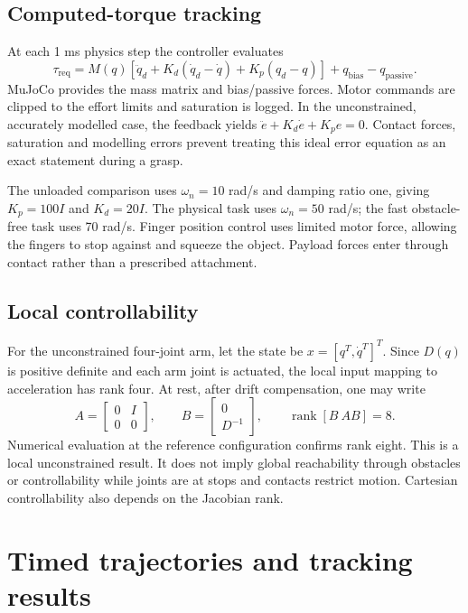 \documentclass[11pt,a4paper]{article}
\begin{document}
\subsection{Computed-torque tracking}
At each 1 ms physics step the controller evaluates
\begin{equation}
 \tau_{\mathrm{req}}=M(q)\left[\ddot q_d+K_d(\dot q_d-\dot q)+K_p(q_d-q)\right]
 +q_{\mathrm{bias}}-q_{\mathrm{passive}}.
\end{equation}
MuJoCo provides the mass matrix and bias/passive forces. Motor commands
are clipped to the effort limits and saturation is logged. In the
unconstrained, accurately modelled case, the feedback yields
$\ddot e+K_d\dot e+K_pe=0$. Contact forces, saturation and modelling errors
prevent treating this ideal error equation as an exact statement during a
grasp.

The unloaded comparison uses $\omega_n=10$ rad/s and damping ratio one,
giving $K_p=100I$ and $K_d=20I$. The physical task uses $\omega_n=50$ rad/s;
the fast obstacle-free task uses 70 rad/s. Finger position control uses
limited motor force, allowing the fingers to stop against and squeeze the
object. Payload forces enter through contact rather than a prescribed
attachment.

\subsection{Local controllability}
For the unconstrained four-joint arm, let the state be
$x=[q^T,\dot q^T]^T$. Since $D(q)$ is positive definite and each arm joint is
actuated, the local input mapping to acceleration has rank four. At rest,
after drift compensation, one may write
\begin{equation}
 A=\begin{bmatrix}0&I\\0&0\end{bmatrix},\qquad
 B=\begin{bmatrix}0\\D^{-1}\end{bmatrix},\qquad
 \operatorname{rank}[B\ AB]=8.
\end{equation}
Numerical evaluation at the reference configuration confirms rank eight.
This is a local unconstrained result. It does not imply global reachability
through obstacles or controllability while joints are at stops and contacts
restrict motion. Cartesian controllability also depends on the Jacobian
rank.
\FloatBarrier

\section{Timed trajectories and tracking results}\label{sec:trajectory}
\end{document}
